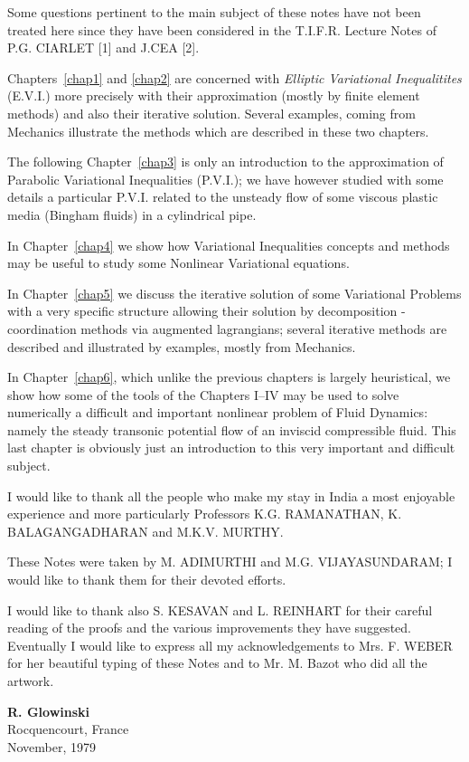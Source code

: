 Some questions pertinent to the main subject of these notes have not
been treated here since they have been considered in the
T.I.F.R. Lecture Notes of P.G. CIARLET [1] and J.CEA [2].

Chapters~\ref{chap1} and \ref{chap2} are concerned with
\textit{Elliptic Variational Inequalitites} (E.V.I.) more precisely
with their approximation (mostly by finite element methods) and also
their iterative solution. Several examples, coming from Mechanics
illustrate the methods which are described in these two chapters.

The following Chapter~\ref{chap3} is only an introduction to the
approximation of Parabolic Variational Inequalities (P.V.I.); we have
however studied with some details a particular P.V.I. related to the
unsteady flow of some viscous plastic media (Bingham fluids) in a
cylindrical pipe.

In Chapter~\ref{chap4} we show how Variational Inequalities concepts
and methods may be useful to study some Nonlinear Variational
equations.

In Chapter~\ref{chap5} we discuss the iterative solution of some
Variational Problems with a very specific structure allowing their
solution by decomposition - coordination methods via augmented
lagrangians; several iterative methods are described and illustrated
by examples, mostly from Mechanics.

In Chapter~\ref{chap6}, which unlike the previous chapters is largely
heuristical, we show how some of the tools of the Chapters I--IV may
be used to solve numerically a difficult and important nonlinear
problem of Fluid Dynamics: namely the steady transonic potential flow
of an inviscid compressible fluid. This last chapter is obviously just
an introduction to this very important and difficult subject.

I would like to thank all the people who make my stay in India a most
enjoyable experience and more particularly Professors K.G. RAMANATHAN,
K. BALAGANGADHARAN and M.K.V. MURTHY.

These Notes were taken by M. ADIMURTHI and M.G. VIJAYASUNDARAM; I
would like to thank them for their devoted efforts.

I would like to thank also S. KESAVAN and L. REINHART for their
careful reading of the proofs and the various improvements they have
suggested. Eventually I would like to express all my acknowledgements
to Mrs. F. WEBER for her beautiful typing of these Notes and to
Mr. M. Bazot who did all the artwork.

\begin{flushright}
 {\large\bf R. Glowinski}\\
 Rocquencourt, France\\
 November, 1979
\end{flushright}


